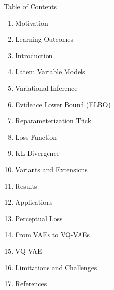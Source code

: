 \begin{frame}[allowframebreaks]{Table of Contents}
\begin{enumerate}
    \setlength{\itemsep}{-0.2em}
    \item Motivation
    \item Learning Outcomes
    \item Introduction
    \item Latent Variable Models
    \item Variational Inference
    \item Evidence Lower Bound (ELBO)
    \item Reparameterization Trick
    \item Loss Function
    \item KL Divergence
    \item Variants and Extensions
    \item Results
    \item Applications
    \item Perceptual Loss
    \item From VAEs to VQ-VAEs
    \item VQ-VAE
    \item Limitations and Challenges
    \item References
\end{enumerate}
\end{frame}
